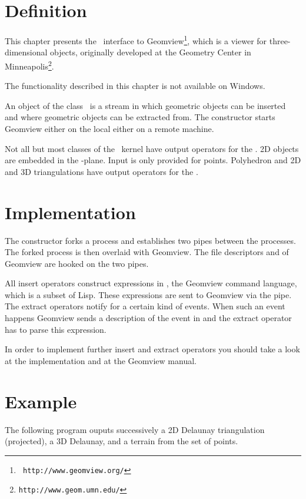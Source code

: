 



\newcommand{\note}[1]{{\bf NOTE: #1}}


\section{Definition}

This chapter presents the \cgal\ interface to Geomview\footnote{\tt
http://www.geomview.org/}, which is a
viewer for three-dimensional objects, originally developed at the Geometry
Center in Minneapolis\footnote{\tt http://www.geom.umn.edu/}.


 The functionality described in this chapter is not available on Windows.


An object of the class \ is a stream in which geometric
objects can be inserted and where geometric objects can be extracted
from. The constructor starts Geomview either on the local either on
a remote machine.



Not all but most classes of the \cgal\ kernel have output
operators for the  . 
2D objects are embedded in the -plane.
Input is only provided for points.
Polyhedron and 2D and 3D triangulations  have output
operators for the  . 


\section{Implementation}

The constructor forks a process and establishes two pipes between the
processes. The forked process is then overlaid with Geomview. The
file descriptors  and  of Geomview are hooked
on the two pipes.

All insert operators construct expressions in , the Geomview
command language, which is a subset of {\sc Lisp}. These expressions
are sent to Geomview via the pipe. The extract operators notify 
for a certain kind of events. When such an event happens Geomview
sends a description of the event in  and the extract operator has
to parse this expression.

In order to implement further insert and extract operators you should
take a look at the implementation and at the Geomview manual.


\section{Example}
The following program ouputs successively a 2D
Delaunay triangulation (projected), a 3D Delaunay, and a terrain
from the set of points.
